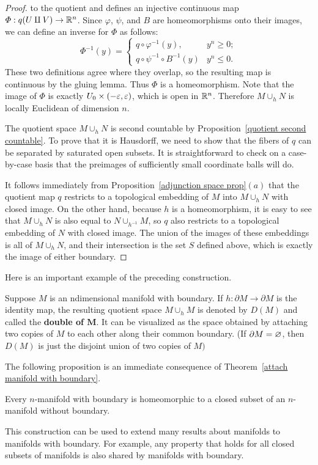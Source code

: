 \begin{proof}
to the quotient and defines an injective continuous map $\varPhi:q(U\amalg V)\to\mathbb{R}^n$. Since $\varphi$, $\psi$, and $B$ are homeomorphisms onto their images, we can define an inverse for $\varPhi$ as follows:
\[\varPhi^{-1}(y)=\begin{cases}
q\circ\varphi^{-1}(y),&y^n\geq 0;\\
q\circ\psi^{-1}\circ B^{-1}(y)&y^n\leq 0.
\end{cases}\]
These two definitions agree where they overlap, so the resulting map is continuous by the gluing lemma. Thus $\varPhi$ is a homeomorphism. Note that the image of $\varPhi$ is exactly $U_0\times(-\varepsilon,\varepsilon)$, which is open in $\mathbb{R}^n$. Therefore $M\cup_hN$ is locally Euclidean of dimension $n$.\par
The quotient space $M\cup_h N$ is second countable by Proposition~\ref{quotient second countable}. To prove that it is Hausdorff, we need to show that the fibers of $q$ can be separated by saturated open subsets. It is straightforward to check on a case-by-case basis that the preimages of sufficiently small coordinate balls will do.\par
It follows immediately from Proposition~\ref{adjunction space prop}$(a)$ that the quotient map $q$ restricts to a topological embedding of $M$ into $M\cup_h N$ with closed image. On the other hand, because $h$ is a homeomorphism, it is easy to see that $M\cup_h N$ is also equal to
$N\cup_{h^{-1}}M$, so $q$ also restricts to a topological embedding of $N$ with closed image. The union of the images of these embeddings is all of $M\cup_hN$, and their intersection is the set $S$ defined above, which is exactly the image of either boundary.
\end{proof}
Here is an important example of the preceding construction.
\begin{example}
Suppose $M$ is an ndimensional manifold with boundary. If $h:\partial M\to \partial M$ is the identity map, the resulting quotient space $M\cup_{h}M$ is denoted by $D(M)$ and called the \textbf{double of $\bm{M}$}. It can be visualized as the space obtained by attaching two copies of $M$ to each other along their common boundary. (If $\partial M=\varnothing$, then $D(M)$ is just the disjoint union of two copies of $M)$
\end{example}
The following proposition is an immediate consequence of Theorem~\ref{attach manifold with boundary}.
\begin{proposition}
Every $n$-manifold with boundary is homeomorphic to a closed subset of an $n$-manifold without boundary.
\end{proposition}
This construction can be used to extend many results about manifolds to manifolds with boundary. For example, any property that holds for all closed subsets of manifolds is also shared by manifolds with boundary.
